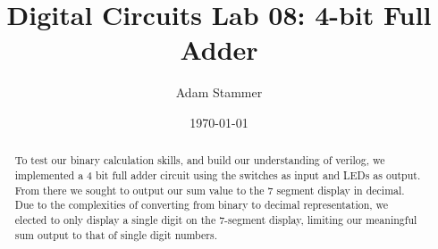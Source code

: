 \documentclass[prb,preprint]{revtex4-1}
\begin{document}
\title{Digital Circuits Lab 08: 4-bit Full Adder}
\author{Adam Stammer}

\date{\today}

\begin{abstract}
To test our binary calculation skills, and build our understanding of verilog, we implemented a 4 bit full adder circuit using the switches as input and LEDs as output. From there we sought to output our sum value to the 7 segment display in decimal. Due to the complexities of converting from binary to decimal representation, we elected to only display a single digit on the 7-segment display, limiting our meaningful sum output to that of single digit numbers.
\end{abstract}

\maketitle


%
%
%
%
%
%
%
%
\end{document}
